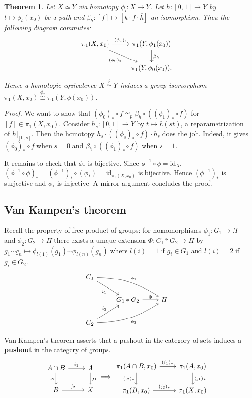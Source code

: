 \documentclass[11pt]{article}
\theoremstyle{definition}
\theoremstyle{plain}
\newtheorem{theorem}{Theorem}
\theoremstyle{remark}
\newcommand{\id}{\textrm{id}}
\begin{document}
\begin{theorem}
Let $X\simeq Y$ via homotopy $\phi_t:X\to Y$. Let $h:[0,1]\to Y$ by $t\mapsto\phi_t(x_0)$ be a path and $\beta_h:[f]\mapsto[h\cdot f\cdot\overline{h}]$ an isomorphism. Then the following diagram commutes:
\[\begin{tikzcd}
\pi_1(X,x_0)\arrow[swap]{dr}{(\phi_0)_\ast}\arrow{r}{(\phi_1)_\ast}&\pi_1(Y,\phi_1(x_0))\arrow{d}{\beta_h}\\
&\pi_1(Y,\phi_0(x_0)).
\end{tikzcd}\]
Hence a homotopic equivalence $X\stackrel{\text{$\phi$}}{\simeq}Y$ induces a group isomorphism $\pi_1(X,x_0)\stackrel{\text{$\phi_\ast$}}{\cong}\pi_1(Y,\phi(x_0))$.
\end{theorem}
\begin{proof}
We want to show that $(\phi_0)_\ast\circ f\simeq_p\beta_h\circ((\phi_1)_\ast\circ f)$ for $[f]\in\pi_1(X,x_0)$. Consider $h_s:[0,1]\to Y$ by $t\mapsto h(st)$, a reparametrization of $h|_{[0,s]}$. Then the homotopy $h_s\cdot((\phi_s)_\ast\circ f)\cdot\overline{h_s}$ does the job. Indeed, it gives $(\phi_0)_\ast\circ f$ when $s=0$ and $\beta_h\circ((\phi_1)_\ast\circ f)$ when $s=1$.\medbreak

It remains to check that $\phi_\ast$ is bijective. Since $\phi^{-1}\circ\phi=\id_X$, $(\phi^{-1}\circ\phi)_\ast=(\phi^{-1})_\ast\circ(\phi_\ast)=\id_{\pi_1(X,x_0)}$ is bijective. Hence $(\phi^{-1})_\ast$ is surjective and $\phi_\ast$ is injective. A mirror argument concludes the proof.
\end{proof}

\subsection{Van Kampen's theorem}\label{7}

Recall the property of free product of groups: for homomorphisms $\phi_1:G_1\to H$ and $\phi_2:G_2\to H$ there exists a unique extension $\Phi:G_1\ast G_2\to H$ by $g_1\cdots g_n\mapsto\phi_{l(1)}(g_1)\cdots\phi_{l(n)}(g_n)$ where $l(i)=1$ if $g_i\in G_1$ and $l(i)=2$ if $g_i\in G_2$.
\[\begin{tikzcd}
G_1\arrow[bend left=15]{drr}{\phi_1}\arrow[swap]{dr}{i_1}\\
&G_1\ast G_2\arrow{r}{\Phi}&H\\
G_2\arrow{ur}{i_2}\arrow[swap,bend right=15]{urr}{\phi_2}
\end{tikzcd}\]\medbreak

Van Kampen's theorem asserts that a pushout in the category of sets induces a \textbf{pushout} in the category of groups.
\[\begin{tikzcd}
A\cap B\arrow{r}{i_1}\arrow[swap]{d}{i_2}&A\arrow{d}{j_1}\\
B\arrow{r}{j_2}&X
\end{tikzcd}\Longrightarrow
\begin{tikzcd}
\pi_1(A\cap B,x_0)\arrow{r}{(i_1)_\ast}\arrow[swap]{d}{(i_2)_\ast}&\pi_1(A,x_0)\arrow{d}{(j_1)_\ast}\\
\pi_1(B,x_0)\arrow{r}{(j_2)_\ast}&\pi_1(X,x_0)
\end{tikzcd}\]
\end{document}
